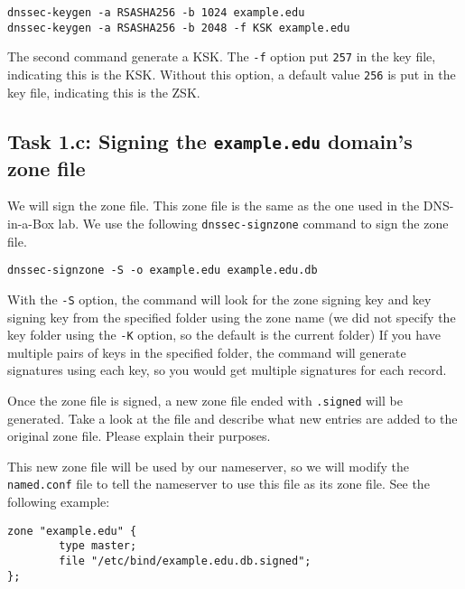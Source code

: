 \begin{lstlisting}
dnssec-keygen -a RSASHA256 -b 1024 example.edu
dnssec-keygen -a RSASHA256 -b 2048 -f KSK example.edu
\end{lstlisting}

The second command generate a KSK. The \texttt{-f} option 
put \texttt{257} in the key file, indicating this is the KSK. 
Without this option, a default value \texttt{256} is put in
the key file, indicating this is the ZSK.




\subsection{Task 1.c: Signing the \texttt{example.edu} domain's zone file} 

We will sign the zone file. This zone file 
is the same as the one used in the DNS-in-a-Box lab. We use the 
following \texttt{dnssec-signzone} command to sign the zone file.  


\begin{lstlisting}
dnssec-signzone -S -o example.edu example.edu.db
\end{lstlisting}
 
With the \texttt{-S} option, the command will look
for the zone signing key and key signing key 
from the specified folder using the zone name (we did not specify the key folder 
using the \texttt{-K} option, so the default is the current folder)
If you have multiple pairs of keys in the specified folder,
the command will generate signatures using each key, so you would get 
multiple signatures for each record. 


Once the zone file is signed, a new zone file ended with
\texttt{.signed} will be generated. Take a look at the file and describe 
what new entries are added to the original zone file. Please explain
their purposes. 


This new zone file will be used by our nameserver, so 
we will modify the \texttt{named.conf} file to tell the 
nameserver to use this file as its zone file. See the following 
example: 

\begin{lstlisting}
zone "example.edu" {
        type master;
        file "/etc/bind/example.edu.db.signed";
};
\end{lstlisting}



